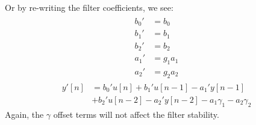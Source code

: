 \documentclass[twoside,a4paper]{article}
\begin{document}
Or by re-writing the filter coefficients, we see:
%
\begin{align}
    \begin{split}
        b_0' &= b_0\\
        b_1' &= b_1\\
        b_2' &= b_2\\
        a_1' &= g_1 a_1\\
        a_2' &= g_2 a_2
    \end{split}
        \label{eq:bq2_coefs_re-write}
\end{align}
%
\begin{equation}
    \begin{split}
        y'[n] &= b_0' u[n]
        + b_1' u[n-1] - a_1' y[n-1] \\
        & + b_2' u[n-2] - a_2' y[n-2]
        - a_1\gamma_1 - a_2\gamma_2
    \end{split}
        \label{eq:nlbq2_re-write2}
\end{equation}
%
Again, the $\gamma$ offset terms will not affect the filter stability.
\end{document}
